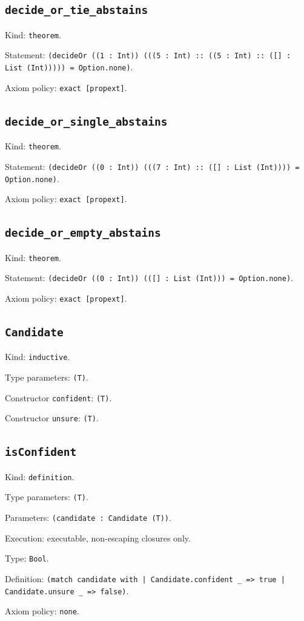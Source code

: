 \documentclass[11pt]{article}
\begin{document}
\subsection*{\texttt{decide\_or\_tie\_abstains}}
\noindent Kind: \texttt{theorem}.\par
\noindent Statement: \texttt{(decideOr ((1 : Int)) (((5 : Int) :: ((5 : Int) :: ([] : List (Int))))) = Option.none)}.\par
\noindent Axiom policy: \texttt{exact [propext]}.\par
\subsection*{\texttt{decide\_or\_single\_abstains}}
\noindent Kind: \texttt{theorem}.\par
\noindent Statement: \texttt{(decideOr ((0 : Int)) (((7 : Int) :: ([] : List (Int)))) = Option.none)}.\par
\noindent Axiom policy: \texttt{exact [propext]}.\par
\subsection*{\texttt{decide\_or\_empty\_abstains}}
\noindent Kind: \texttt{theorem}.\par
\noindent Statement: \texttt{(decideOr ((0 : Int)) (([] : List (Int))) = Option.none)}.\par
\noindent Axiom policy: \texttt{exact [propext]}.\par
\subsection*{\texttt{Candidate}}
\noindent Kind: \texttt{inductive}.\par
\noindent Type parameters: \texttt{(T)}.\par
\noindent Constructor \texttt{confident}: \texttt{(T)}.\par
\noindent Constructor \texttt{unsure}: \texttt{(T)}.\par
\subsection*{\texttt{isConfident}}
\noindent Kind: \texttt{definition}.\par
\noindent Type parameters: \texttt{(T)}.\par
\noindent Parameters: \texttt{(candidate : Candidate (T))}.\par
\noindent Execution: executable, non-escaping closures only.\par
\noindent Type: \texttt{Bool}.\par
\noindent Definition: \texttt{(match candidate with | Candidate.confident \_ => true | Candidate.unsure \_ => false)}.\par
\noindent Axiom policy: \texttt{none}.\par
\end{document}
